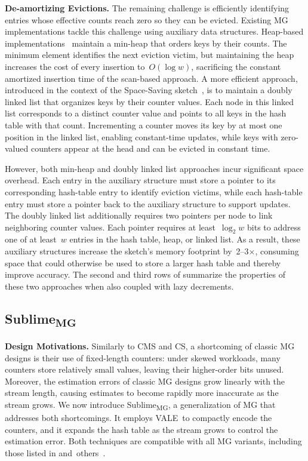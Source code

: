 \documentclass[sigconf]{acmart}
\newcommand{\sketch}{Sublime}
\newcommand{\sketchmg}{\sketch\textsubscript{MG}\xspace}
\newcommand{\counterencodingabbrv}{VALE}
\begin{document}
\textbf{De-amortizing Evictions.}
The remaining challenge is efficiently identifying entries whose effective counts reach zero so they can be evicted.
Existing MG implementations tackle this challenge using auxiliary data structures.
Heap-based implementations~\cite{MGH1,MGH2,BatchUpdateMisraGries} maintain a min-heap that orders keys by their counts.
The minimum element identifies the next eviction victim, but maintaining the heap increases the cost of every insertion to~$O(\log w)$, sacrificing the constant amortized insertion time of the scan-based approach.
A more efficient approach, introduced in the context of the Space-Saving sketch~\cite{SpaceSaving}, is to maintain a doubly linked list that organizes keys by their counter values.
Each node in this linked list corresponds to a distinct counter value and points to all keys in the hash table with that count.
Incrementing a counter moves its key by at most one position in the linked list, enabling constant-time updates, while keys with zero-valued counters appear at the head and can be evicted in constant time.

However, both min-heap and doubly linked list approaches incur significant space overhead.
Each entry in the auxiliary structure must store a pointer to its corresponding hash-table entry to identify eviction victims, while each hash-table entry must store a pointer back to the auxiliary structure to support updates.
The doubly linked list additionally requires two pointers per node to link neighboring counter values.
Each pointer requires at least~$\log_2 w$ bits to address one of at least~$w$ entries in the hash table, heap, or linked list.
As a result, these auxiliary structures increase the sketch's memory footprint by~2--3$\times$, consuming space that could otherwise be used to store a larger hash table and thereby improve accuracy.
The second and third rows of  summarize the properties of these two approaches when also coupled with lazy decrements.

\subsection{\sketchmg}\label{sec:mg_sublime}
\textbf{Design Motivations.}
Similarly to CMS and CS, a shortcoming of classic MG designs is their use of fixed-length counters: under skewed workloads, many counters store relatively small values, leaving their higher-order bits unused.
Moreover, the estimation errors of classic MG designs grow linearly with the stream length, causing estimates to become rapidly more inaccurate as the stream grows.
We now introduce \sketchmg, a generalization of MG that addresses both shortcomings.
It employs \counterencodingabbrv\ to compactly encode the counters, and it expands the hash table as the stream grows to control the estimation error.
Both techniques are compatible with all MG variants, including those listed in  \mbox{and others~\cite{UnbiasedSpaceSaving,SpaceSavingBoundedDeletes,HeavyGuardian,HeavyKeeper,WavingSketch}}.
\end{document}
